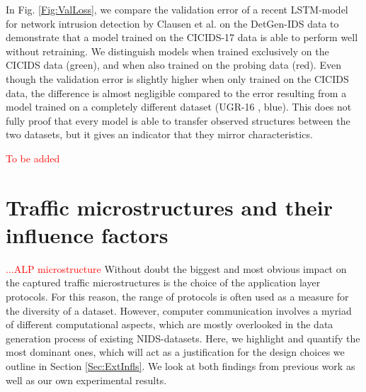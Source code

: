\documentclass[runningheads]{llncs}
\begin{document}
In Fig. \ref{Fig:ValLoss}, we compare the validation error of a recent LSTM-model for network intrusion detection by Clausen et al. \cite{henryLSTM} on the DetGen-IDS data to demonstrate that a model trained on the CICIDS-17 data is able to perform well without retraining. We distinguish models when trained exclusively on the CICIDS data (green), and when also trained on the probing data (red). 
Even though the validation error is slightly higher when only trained on the CICIDS data, the difference is almost negligible compared to the error resulting from a model trained on a completely different dataset (UGR-16 \cite{macia2018ugr}, blue). This does not fully proof that every model is able to transfer observed structures between the two datasets, but it gives an indicator that they mirror characteristics.




\textcolor{red}{To be added}




\section{Traffic microstructures and their influence factors}\label{Sec:DetGenMicro}

\textcolor{red}{...ALP microstructure}
Without doubt the biggest and most obvious impact on the captured traffic microstructures is the choice of the application layer protocols. For this reason, the range of protocols is often used as a measure for the diversity of a dataset. However, computer communication involves a myriad of different computational aspects, which are mostly overlooked in the data generation process of existing NIDS-datasets. Here, we highlight and quantify the most dominant ones, which will act as a justification for the design choices we outline in Section \ref{Sec:ExtInfls}. We look at both findings from previous work as well as our own experimental results.
\end{document}
